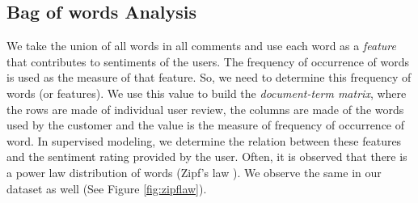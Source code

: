 \documentclass[11pt, letterpaper]{article}
\begin{document}
\subsection{Bag of words Analysis}
We take the union of all words in all comments and use each word as a \textit{feature} that contributes to sentiments of the users. The frequency of occurrence of words is used as the measure of that feature. So, we need to determine this frequency of words (or features). We use this value to build the \textit{document-term matrix}, where the rows are made of individual user review, the columns are made of the words used by the customer and the value is the measure of frequency of occurrence of word. In supervised modeling, we determine the relation between these features and the sentiment rating provided by the user. Often, it is observed that there is a power law distribution of words (Zipf’s law \autocite{zipfslaw}). We observe the same in our dataset as well (See Figure \ref{fig:zipflaw}). 
\end{document}

